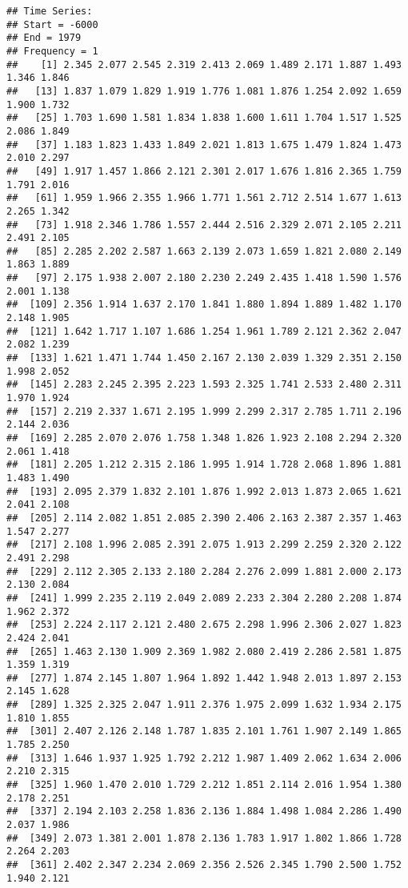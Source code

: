 \documentclass[
]{article}
\begin{document}
\begin{verbatim}
## Time Series:
## Start = -6000 
## End = 1979 
## Frequency = 1 
##    [1] 2.345 2.077 2.545 2.319 2.413 2.069 1.489 2.171 1.887 1.493 1.346 1.846
##   [13] 1.837 1.079 1.829 1.919 1.776 1.081 1.876 1.254 2.092 1.659 1.900 1.732
##   [25] 1.703 1.690 1.581 1.834 1.838 1.600 1.611 1.704 1.517 1.525 2.086 1.849
##   [37] 1.183 1.823 1.433 1.849 2.021 1.813 1.675 1.479 1.824 1.473 2.010 2.297
##   [49] 1.917 1.457 1.866 2.121 2.301 2.017 1.676 1.816 2.365 1.759 1.791 2.016
##   [61] 1.959 1.966 2.355 1.966 1.771 1.561 2.712 2.514 1.677 1.613 2.265 1.342
##   [73] 1.918 2.346 1.786 1.557 2.444 2.516 2.329 2.071 2.105 2.211 2.491 2.105
##   [85] 2.285 2.202 2.587 1.663 2.139 2.073 1.659 1.821 2.080 2.149 1.863 1.889
##   [97] 2.175 1.938 2.007 2.180 2.230 2.249 2.435 1.418 1.590 1.576 2.001 1.138
##  [109] 2.356 1.914 1.637 2.170 1.841 1.880 1.894 1.889 1.482 1.170 2.148 1.905
##  [121] 1.642 1.717 1.107 1.686 1.254 1.961 1.789 2.121 2.362 2.047 2.082 1.239
##  [133] 1.621 1.471 1.744 1.450 2.167 2.130 2.039 1.329 2.351 2.150 1.998 2.052
##  [145] 2.283 2.245 2.395 2.223 1.593 2.325 1.741 2.533 2.480 2.311 1.970 1.924
##  [157] 2.219 2.337 1.671 2.195 1.999 2.299 2.317 2.785 1.711 2.196 2.144 2.036
##  [169] 2.285 2.070 2.076 1.758 1.348 1.826 1.923 2.108 2.294 2.320 2.061 1.418
##  [181] 2.205 1.212 2.315 2.186 1.995 1.914 1.728 2.068 1.896 1.881 1.483 1.490
##  [193] 2.095 2.379 1.832 2.101 1.876 1.992 2.013 1.873 2.065 1.621 2.041 2.108
##  [205] 2.114 2.082 1.851 2.085 2.390 2.406 2.163 2.387 2.357 1.463 1.547 2.277
##  [217] 2.108 1.996 2.085 2.391 2.075 1.913 2.299 2.259 2.320 2.122 2.491 2.298
##  [229] 2.112 2.305 2.133 2.180 2.284 2.276 2.099 1.881 2.000 2.173 2.130 2.084
##  [241] 1.999 2.235 2.119 2.049 2.089 2.233 2.304 2.280 2.208 1.874 1.962 2.372
##  [253] 2.224 2.117 2.121 2.480 2.675 2.298 1.996 2.306 2.027 1.823 2.424 2.041
##  [265] 1.463 2.130 1.909 2.369 1.982 2.080 2.419 2.286 2.581 1.875 1.359 1.319
##  [277] 1.874 2.145 1.807 1.964 1.892 1.442 1.948 2.013 1.897 2.153 2.145 1.628
##  [289] 1.325 2.325 2.047 1.911 2.376 1.975 2.099 1.632 1.934 2.175 1.810 1.855
##  [301] 2.407 2.126 2.148 1.787 1.835 2.101 1.761 1.907 2.149 1.865 1.785 2.250
##  [313] 1.646 1.937 1.925 1.792 2.212 1.987 1.409 2.062 1.634 2.006 2.210 2.315
##  [325] 1.960 1.470 2.010 1.729 2.212 1.851 2.114 2.016 1.954 1.380 2.178 2.251
##  [337] 2.194 2.103 2.258 1.836 2.136 1.884 1.498 1.084 2.286 1.490 2.037 1.986
##  [349] 2.073 1.381 2.001 1.878 2.136 1.783 1.917 1.802 1.866 1.728 2.264 2.203
##  [361] 2.402 2.347 2.234 2.069 2.356 2.526 2.345 1.790 2.500 1.752 1.940 2.121

\end{verbatim}
\end{document}
